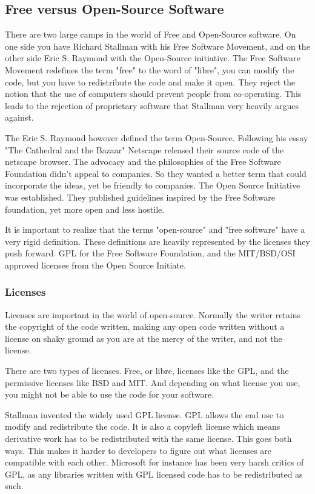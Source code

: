 \documentclass[12pt]{article}
\begin{document}
\subsection{Free versus Open-Source Software}
There are two large camps in the world of Free and Open-Source software. On one
side you have Richard Stallman with his Free Software Movement, and on the other
side Eric S. Raymond with the Open-Source initiative. The Free Software Movement
redefines the term "free" to the word of "libre"\cite{fsf}, you can modify the code, but
you have to redistribute the code and make it open. They reject the notion that
the use of computers should prevent people from co-operating. This leads to the
rejection of proprietary software that Stallman very heavily argues against.

The Eric S. Raymond however defined the term Open-Source. Following his essay
"The Cathedral and the Bazaar" Netscape released their source code of the
netscape browser. The advocacy and the philosophies of the Free Software
Foundation didn't appeal to companies. So they wanted a better term that could
incorporate the ideas, yet be friendly to companies. The Open Source Initiative
was established. They published guidelines inspired by the Free Software
foundation, yet more open and less hostile\cite{osi}.

It is important to realize that the terms "open-source" and "free software" have
a very rigid definition. These definitions are heavily represented by the
licenses they push forward. GPL for the Free Software Foundation, and the
MIT/BSD/OSI approved licenses from the Open Source Initiate.


\subsubsection{Licenses}
Licenses are important in the world of open-source. Normally the writer retains
the copyright of the code written, making any open code written without a
license on shaky ground as you are at the mercy of the writer, and not the
license.

There are two types of licenses. Free, or libre, licenses like the GPL,
and the permissive licenses like BSD and MIT. And depending on what license you
use, you might not be able to use the code for your software.

Stallman invented the widely used GPL license. GPL allows the end use to modify
and redistribute the code. It is also a copyleft license which means
derivative work has to be redistributed with the same license. This goes both
ways. This makes it harder to developers to figure out what licenses are
compatible with each other. Microsoft for instance has been very harsh critics
of GPL, as any libraries written with GPL licensed code has to be redistributed
as such.
\end{document}
